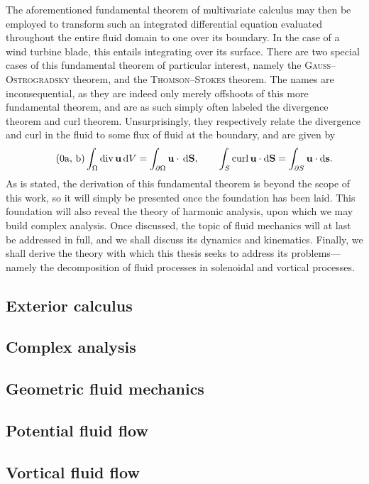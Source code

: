 The aforementioned fundamental theorem of multivariate calculus may then be employed to transform such an integrated differential equation evaluated throughout the entire fluid domain to one over its boundary.
In the case of a wind turbine blade, this entails integrating over its surface.
There are two special cases of this fundamental theorem of particular interest, namely the \textsc{Gauss}--\textsc{Ostrogradsky} theorem, and the \textsc{Thomson}--\textsc{Stokes} theorem.
The names are inconsequential, as they are indeed only merely offshoots of this more fundamental theorem, and are as such simply often labeled the divergence theorem and curl theorem.
Unsurprisingly, they respectively relate the divergence and curl in the fluid to some flux of fluid at the boundary, and are given by
\begin{subequations}\label{eq:divergence_curl}
        \begin{equation}\tag{\theequation{a, b}}
                \int_{\Omega} \Div\uvec \,\dee V = \int_{\partial\Omega} \uvec\cdot \,\dee\mathbf{S}, \qquad \int_{S} \Curl\uvec \cdot\dee\mathbf{S} = \int_{\partial S} \uvec \cdot\dee\svec.
        \end{equation}
\end{subequations}
As is stated, the derivation of this fundamental theorem is beyond the scope of this work, so it will simply be presented once the foundation has been laid.
This foundation will also reveal the theory of harmonic analysis, upon which we may build complex analysis.
Once discussed, the topic of fluid mechanics will at last be addressed in full, and we shall discuss its dynamics and kinematics.
Finally, we shall derive the theory with which this thesis seeks to address its problems---namely the decomposition of fluid processes in solenoidal and vortical processes.

\subsection{Exterior calculus}


\subsection{Complex analysis}


\subsection{Geometric fluid mechanics}


\subsection{Potential fluid flow}


\subsection{Vortical fluid flow}

